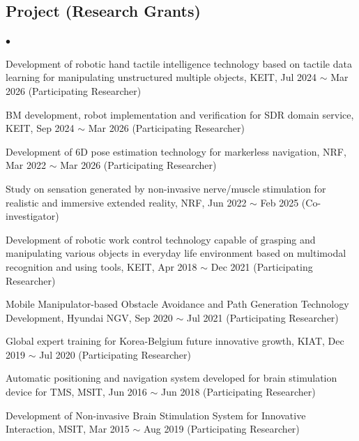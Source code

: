 \documentclass[margin,line]{res}
\newenvironment{list2}{
  \begin{list}{$\bullet$}{%
      \setlength{\itemsep}{0.05in}
      \setlength{\parsep}{0in} \setlength{\parskip}{0in}
      \setlength{\topsep}{0in} \setlength{\partopsep}{0in} 
      \setlength{\leftmargin}{0.2in}}}{\end{list}}
\begin{document}
\begin{resume}
\vspace*{.05in} %


\section{\sc Project (Research Grants)}
\vspace*{.05in} %
\begin{list2}
\setlength{\itemsep}{0.07in} %



\item Development of robotic hand tactile intelligence technology based on tactile data learning for manipulating unstructured multiple objects, KEIT, Jul 2024 $\sim$ Mar 2026 (Participating Researcher)
\item BM development, robot implementation and verification for SDR domain service, KEIT, Sep 2024 $\sim$ Mar 2026 (Participating Researcher)
\item Development of 6D pose estimation technology for markerless navigation, NRF, Mar 2022 $\sim$ Mar 2026 (Participating Researcher)
\item Study on sensation generated by non-invasive nerve/muscle stimulation for realistic and immersive extended reality, NRF, Jun 2022 $\sim$ Feb 2025 (Co-investigator)
\item Development of robotic work control technology capable of grasping and manipulating various objects in everyday life environment based on multimodal recognition and using tools, KEIT, Apr 2018 $\sim$ Dec 2021 (Participating Researcher)
\item Mobile Manipulator-based Obstacle Avoidance and Path Generation Technology Development, Hyundai NGV, Sep 2020 $\sim$ Jul 2021 (Participating Researcher)
\item Global expert training for Korea-Belgium future innovative growth, KIAT, Dec 2019 $\sim$ Jul 2020 (Participating Researcher)
\item Automatic positioning and navigation system developed for brain stimulation device for TMS, MSIT, Jun 2016 $\sim$ Jun 2018 (Participating Researcher)
\item Development of Non-invasive Brain Stimulation System for Innovative Interaction, MSIT, Mar 2015 $\sim$ Aug 2019 (Participating Researcher)
\end{list2}

\vspace*{.1in} %


\end{resume}
\end{document}

